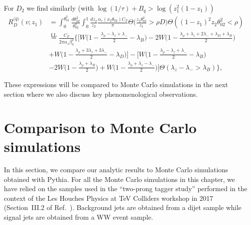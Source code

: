 For $D_2$ we find similarly (with $\log(1/\tau)+B_q>\log(z_1^2(1-z_1))$
\begin{align}
  R_D^\text{($\bar q$)}(v;z_1) 
  & = \int_0^{\theta_{01}^2} \frac{d\theta_{02}^2}{\theta_{02}^2}
  \int_0^1 \frac{dz_2}{z_2}
  \frac{\alpha_s(x_2\theta_{02})C_F}{\pi}
  \Theta\Big(\frac{z_2\theta_{02}^2}{z_1}>\rho D\Big)\Theta((1-z_1)^2z_2\theta_{02}^2<\rho)
  \nonumber\\
  & \overset{\text{LL}}= \frac{C_F}{2\pi\alpha_s\beta_0^2}\bigg\{
    \bigg[ W\Big(1-\frac{\lambda_\rho-\lambda_z+\lambda_-}{2}-\lambda_B\Big)
        -2 W\Big(1-\frac{\lambda_\rho+\lambda_z+2\lambda_-+\lambda_D+\lambda_B}{2}\Big)
    \nonumber\\
  & + W\Big(1-\frac{\lambda_\rho+3\lambda_z+3\lambda_-}{2}-\lambda_D\Big)\bigg]
    -\bigg[W\Big(1-\frac{\lambda_\rho-\lambda_z+\lambda_-}{2}-\lambda_B\Big)\\
  & -2 W\Big(1-\frac{\lambda_\rho+\lambda_B}{2}\Big)
    + W\Big(1-\frac{\lambda_\rho+\lambda_z-\lambda_-}{2}\Big)\bigg]
    \Theta(\lambda_z-\lambda_->\lambda_B)\bigg\},\nonumber
\end{align}

These expressions will be compared to Monte Carlo simulations in the
next section where we also discuss key phenomenological observations.

\section{Comparison to Monte Carlo simulations}

In this section, we compare our analytic results to Monte Carlo
simulations obtained with Pythia. For all the Monte Carlo simulations in
this chapter, we have relied on the samples used in the ``two-prong
tagger study'' performed in the context of the Les Houches
Physics at TeV Colliders workshop in 2017 (Section~III.2 of
Ref.~\cite{Bendavid:2018nar}).
%
Background jets are obtained from a dijet sample while signal jets
are obtained from a WW event sample.

